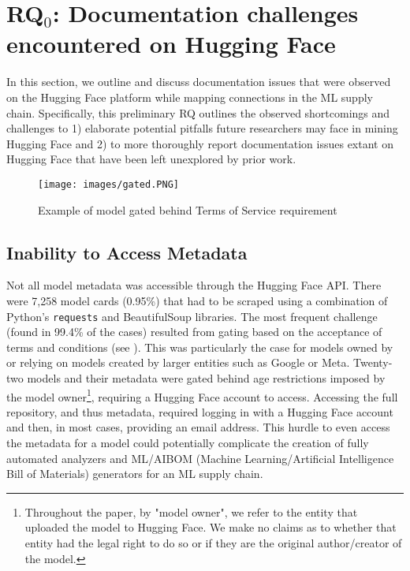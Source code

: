 
\section{RQ$_0$: Documentation challenges encountered on Hugging Face}
\label{sec:rq0}
In this section, we outline and discuss documentation issues that were observed on the Hugging Face platform while mapping connections in the ML supply chain.  Specifically, this preliminary RQ outlines the observed shortcomings and challenges to 1) elaborate potential pitfalls future researchers may face in mining Hugging Face and 2) to more thoroughly report documentation issues extant on Hugging Face that have been left unexplored by prior work.

\begin{figure}[t]
\centering
\texttt{[image: images/gated.PNG]}
\caption{Example of model gated behind Terms of Service requirement}
\label{fig:gated}
\end{figure}

\subsection{Inability to Access Metadata}
\label{sec:no_api_access}
Not all model metadata was accessible through the Hugging Face API.  There were 7,258 model cards (0.95\%) %
that had to be scraped using a combination of Python's \texttt{requests} \cite{requests} and BeautifulSoup \cite{bs4} libraries.  The most frequent challenge (\ie found in 99.4\% of the cases) resulted from gating based on the acceptance of terms and conditions (see ).  This was particularly the case for models owned by or relying on models created by larger entities such as Google or Meta.  Twenty-two models and their metadata were gated behind age restrictions imposed by the model owner\footnote{Throughout the paper, by "model owner", we refer to the entity that uploaded the model to Hugging Face.  We make no claims as to whether that entity had the legal right to do so or if they are the original author/creator of the model.}, requiring a Hugging Face account to access. Accessing the full repository, and thus metadata, required logging in with a Hugging Face account and then, in most cases, providing an email address.  This hurdle to even access the metadata for a model could potentially complicate the creation of fully automated analyzers and ML/AIBOM (Machine Learning/Artificial Intelligence Bill of Materials) %
generators for an ML supply chain.



